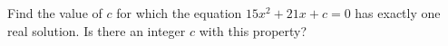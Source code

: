Find the value of $c$ for which the equation $15x^2+21x+c=0$ has exactly one real solution. Is there an integer $c$ with this property?
